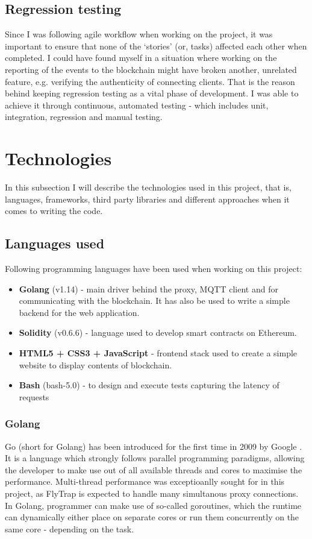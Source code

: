 \subsection{Regression testing}

Since I was following agile workflow when working on the project, it was important to ensure that none of the `stories' (or, tasks) affected each other when completed. I could have found myself in a situation where working on the reporting of the events to the blockchain might have broken another, unrelated feature, e.g. verifying the authenticity of connecting clients. That is the reason behind keeping regression testing as a vital phase of development. I was able to achieve it through continuous, automated testing - which includes unit, integration, regression and manual testing.

\section{Technologies}

In this subsection I will describe the technologies used in this project, that is, languages, frameworks, third party libraries and different approaches when it comes to writing the code.

\subsection{Languages used}

Following programming languages have been used when working on this project:
\begin{itemize}
 \item \textbf{Golang} (v1.14) - main driver behind the proxy, MQTT client and for communicating with the blockchain. It has also be used to write a simple backend for the web application.
 \item \textbf{Solidity} (v0.6.6) - language used to develop smart contracts on Ethereum.
 \item \textbf{HTML5 + CSS3 + JavaScript} - frontend stack used to create a simple website to display contents of blockchain.
 \item \textbf{Bash} (bash-5.0) - to design and execute tests capturing the latency of requests
\end{itemize}

\subsubsection{Golang}
Go (short for Golang) has been introduced for the first time in 2009 by Google \cite{team2009go}. It is a language which strongly follows parallel programming paradigms, allowing the developer to make use out of all available threads and cores to maximise the performance. Multi-thread performance was exceptioanlly sought for in this project, as FlyTrap is expected to handle many simultanous proxy connections. In Golang, programmer can make use of so-called goroutines, which the runtime can dynamically either place on separate cores or run them concurrently on the same core - depending on the task.

